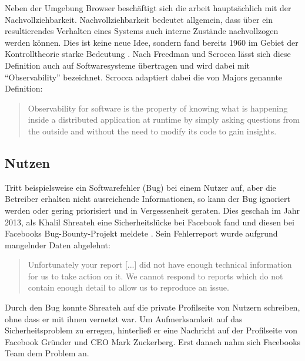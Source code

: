 Neben der Umgebung Browser beschäftigt sich die arbeit hauptsächlich mit der Nachvollziehbarkeit. Nachvollziehbarkeit bedeutet allgemein, dass über ein resultierendes Verhalten eines Systems auch interne Zustände nachvollzogen werden können. Dies ist keine neue Idee, sondern fand bereits 1960 im Gebiet der Kontrolltheorie starke Bedeutung \cite{OnTheGeneralTheoryOfControlSystems}. Nach Freedman \cite{TestabilityOfSoftwareComponents} und Scrocca \etal \cite{TheKaijuProjectPaper} lässt sich diese Definition auch auf Softwaresysteme übertragen und wird dabei mit \enquote{Observability} bezeichnet. Scrocca adaptiert dabei die von Majors genannte Definition:

\begin{quotation}
Observability for software is the property of knowing what is happening inside a distributed application at runtime by simply asking questions from the outside and without the need to modify its code to gain insights.
\end{quotation}

\vspace{-0.5\baselineskip}
\subsection{Nutzen}

Tritt beispielsweise ein Softwarefehler (Bug) bei einem Nutzer auf, aber die Betreiber erhalten nicht ausreichende Informationen, so kann der Bug ignoriert werden oder gering priorisiert und in Vergessenheit geraten. Dies geschah im Jahr 2013, als Khalil Shreateh eine Sicherheitslücke bei Facebook fand und diesen bei Facebooks Bug-Bounty-Projekt meldete \cite{FacebookBugBounyHunt}. Sein Fehlerreport wurde aufgrund mangelnder Daten abgelehnt:

\begin{quotation}
Unfortunately your report [...] did not have enough technical information for us to take action  on  it. We  cannot  respond  to  reports  which  do  not contain enough detail to allow us to reproduce an issue.
\end{quotation}

Durch den Bug konnte Shreateh auf die private Profilseite von Nutzern schreiben, ohne dass er mit ihnen vernetzt war. Um Aufmerksamkeit auf das Sicherheitsproblem zu erregen, hinterließ er eine Nachricht auf der Profilseite von Facebook Gründer und CEO Mark Zuckerberg. Erst danach nahm sich Facebooks Team dem Problem an.

\vspace{-0.5\baselineskip}
